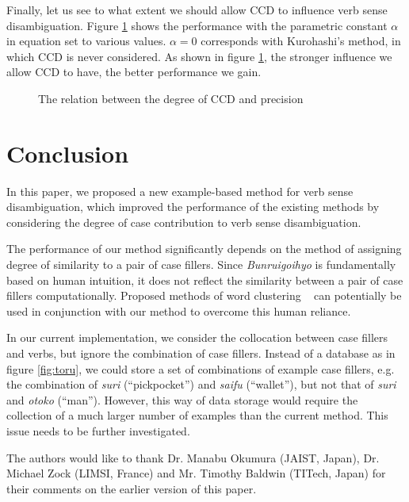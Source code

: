 Finally, let us see to what extent we should allow CCD to influence
verb sense disambiguation. Figure \ref{fig:ccd} shows the performance
with the parametric constant $\alpha$ in equation  set to
various values. $\alpha = 0$ corresponds with Kurohashi's method, in
which CCD is never considered. As shown in figure \ref{fig:ccd}, the
stronger influence we allow CCD to have, the better performance we
gain.

\begin{figure}[htbp]
  \begin{center}
    \leavevmode {}
    
  \end{center}
  \caption{The relation between the degree of CCD and precision}
  \label{fig:ccd}
\end{figure}

\section{Conclusion}
\label{sec:conclusion}

In this paper, we proposed a new example-based method for verb sense
disambiguation, which improved the performance of the existing methods
by considering the degree of case contribution to verb sense
disambiguation.

The performance of our method significantly depends on the method of
assigning degree of similarity to a pair of case fillers.  Since {\it
  Bunruigoihyo} is fundamentally based on human intuition, it does not
reflect the similarity between a pair of case fillers computationally. 
Proposed methods of word clustering ~\cite[etc.]{tokunaga:95} can
potentially be used in conjunction with our method to overcome this
human reliance.

In our current implementation, we consider the collocation between
case fillers and verbs, but ignore the combination of case fillers. 
Instead of a database as in figure \ref{fig:toru}, we could store a
set of combinations of example case fillers, e.g. the combination of
{\it suri\/} (``pickpocket'') and {\it saifu\/} (``wallet''), but not
that of {\it suri\/} and {\it otoko\/} (``man'').  However, this way
of data storage would require the collection of a much larger number
of examples than the current method.  This issue needs to be further
investigated.

\acknowledgment

The authors would like to thank Dr. Manabu Okumura (JAIST, Japan), Dr. 
Michael Zock (LIMSI, France) and Mr. Timothy Baldwin (TITech, Japan)
for their comments on the earlier version of this paper.

